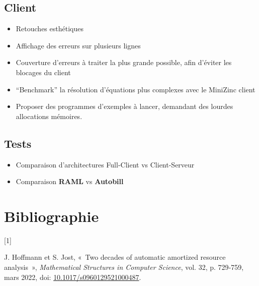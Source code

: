 \documentclass[
  12pt,
]{article}
\providecommand{\tightlist}{%
  \setlength{\itemsep}{0pt}\setlength{\parskip}{0pt}}
\newlength{\cslhangindent}
\newlength{\csllabelwidth}
\newlength{\cslentryspacingunit} %
\newenvironment{CSLReferences}[2] %
 {%
  \setlength{\parindent}{0pt}
  \ifodd #1
  \let\oldpar\par
  \def\par{\hangindent=\cslhangindent\oldpar}
  \fi
  \setlength{\parskip}{#2\cslentryspacingunit}
 }%
 {}
\newcommand{\CSLLeftMargin}[1]{\parbox[t]{\csllabelwidth}{#1}}
\newcommand{\CSLRightInline}[1]{\parbox[t]{\linewidth - \csllabelwidth}{#1}\break}
\begin{document}
\hypertarget{client}{%
\subsection{Client}\label{client}}

\begin{itemize}
\tightlist
\item
  Retouches esthétiques
\item
  Affichage des erreurs sur plusieurs lignes
\item
  Couverture d'erreurs à traiter la plus grande possible, afin d'éviter
  les blocages du client
\item
  ``Benchmark'' la résolution d'équations plus complexes avec le
  MiniZinc client
\item
  Proposer des programmes d'exemples à lancer, demandant des lourdes
  allocations mémoires.
\end{itemize}

\hypertarget{tests}{%
\subsection{Tests}\label{tests}}

\begin{itemize}
\tightlist
\item
  Comparaison d'architectures Full-Client vs Client-Serveur
\item
  Comparaison \textbf{RAML} vs \textbf{Autobill}
\end{itemize}

\newpage

\hypertarget{bibliography}{%
\section*{Bibliographie}\label{bibliography}}

\hypertarget{refs}{}
\begin{CSLReferences}{0}{0}
\leavevmode{}%
\CSLLeftMargin{{[}1{]} }%
\CSLRightInline{J. Hoffmann et S. Jost, {«~Two decades of automatic
amortized resource analysis~»}, \emph{Mathematical Structures in
Computer Science}, vol. 32, p. 729‑759, mars 2022, doi:
\href{https://doi.org/10.1017/s0960129521000487}{10.1017/s0960129521000487}.}

\end{CSLReferences}
\end{document}
